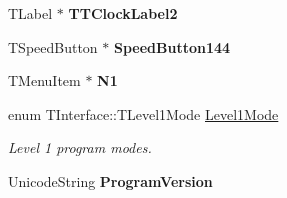 \begin{DoxyCompactItemize}
\item 
\mbox{\label{class_t_interface_a4ea88dbbf3539f837e0e6eefcc127214}} 
T\+Label $\ast$ {\bfseries T\+T\+Clock\+Label2}
\item 
\mbox{\label{class_t_interface_a67212c07e268f5a78ee5a4fcfe8eaca5}} 
T\+Speed\+Button $\ast$ {\bfseries Speed\+Button144}
\item 
\mbox{\label{class_t_interface_a424b363a104a95f4822dd16de1097ede}} 
T\+Menu\+Item $\ast$ {\bfseries N1}
\item 
\mbox{\label{class_t_interface_a4144280e4a8af28178c7949976fc67bd}} 
enum T\+Interface\+::\+T\+Level1\+Mode \mbox{\hyperlink{class_t_interface_a4144280e4a8af28178c7949976fc67bd}{Level1\+Mode}}
\begin{DoxyCompactList}\small\item\em Level 1 program modes. \end{DoxyCompactList}\item 
\mbox{\label{class_t_interface_a83d8b6f4fbf587f117e4e166259190d4}} 
Unicode\+String {\bfseries Program\+Version}
\end{DoxyCompactItemize}
